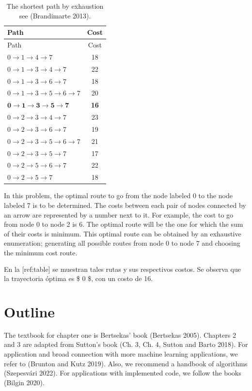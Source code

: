 \documentclass[
  letterpaper,
  DIV=11,
  numbers=noendperiod]{scrreprt}
\theoremstyle{definition}
\theoremstyle{remark}
\begin{document}
\begin{longtable}[]{@{}lc@{}}
\caption{The shortest path by exhaustion see (Brandimarte
2013).}\label{tbl-brandimarte_paths}\tabularnewline
\toprule\noalign{}
Path & Cost \\
\midrule\noalign{}
\endfirsthead
\toprule\noalign{}
Path & Cost \\
\midrule\noalign{}
\endhead
\bottomrule\noalign{}
\endlastfoot
\(0 \to 1 \to 4 \to 7\) & 18 \\
\(0 \to 1 \to 3 \to 4 \to 7\) & 22 \\
\(0 \to 1 \to 3 \to 6 \to 7\) & 18 \\
\(0 \to 1 \to 3 \to 5 \to 6 \to 7\) & 20 \\
\(\mathbf{0 \to 1 \to 3 \to 5 \to 7}\) & \textbf{16} \\
\(0 \to 2 \to 3 \to 4 \to 7\) & 23 \\
\(0 \to 2 \to 3 \to 6 \to 7\) & 19 \\
\(0 \to 2 \to 3 \to 5 \to 6 \to 7\) & 21 \\
\(0 \to 2 \to 3 \to 5 \to 7\) & 17 \\
\(0 \to 2 \to 5 \to 6 \to 7\) & 22 \\
\(0 \to 2 \to 5 \to 7\) & 18 \\
\end{longtable}

In this problem, the optimal route to go from the node labeled \(0\) to
the node labeled \(7\) is to be determined. The costs between each pair
of nodes connected by an arrow are represented by a number next to it.
For example, the cost to go from node 0 to node 2 is 6. The optimal
route will be the one for which the sum of their costs is minimum. This
optimal route can be obtained by an exhaustive enumeration; generating
all possible routes from node \(0\) to node \(7\) and choosing the
minimum cost route.

En la {[}ref:table{]} se muestran tales rutas y sus respectivos costos.
Se observa que la trayectoria óptima es \$ 0    
\$, con un costo de 16.


\chapter*{Outline}\label{outline}


The textbook for chapter one is Bertsekas' book (Bertsekas 2005).
Chapters 2 and 3 are adapted from Sutton's book (Ch. 3, Ch. 4, Sutton
and Barto 2018). For application and broad connection with more machine
learning applications, we refer to (Brunton and Kutz 2019). Also, we
recommend a handbook of algorithms (Szepesvári 2022). For applications
with implemented code, we follow the books (Bilgin 2020).
\end{document}
